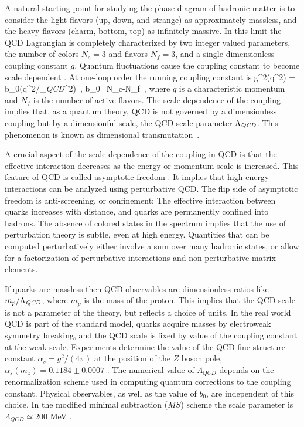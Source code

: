  A natural starting point for studying the phase diagram of hadronic 
matter is to consider the light flavors (up, down, and strange) as
approximately massless, and the heavy flavors (charm, bottom, top) as
infinitely massive. In this limit the QCD Lagrangian is completely
characterized by two integer valued parameters, the number of colors 
$N_c=3$ and flavors $N_f=3$, and a single dimensionless coupling 
constant $g$. Quantum fluctuations cause the coupling constant
to become scale dependent \cite{Gross:1973id,Politzer:1973fx}. At 
one-loop order the running coupling constant is
\be
\label{g_1l}
 g^2(q^2) = 
  {b_0\log(q^2/\Lambda_{\it QCD}^2)}\, , \hspace{1cm}
 b_0=N_c-N_f\, ,
\ee
where $q$ is a characteristic momentum and $N_f$ is the number of active 
flavors. The scale dependence of the coupling implies that, as a quantum 
theory, QCD is not governed by a dimensionless coupling but by a 
dimensionful scale, the QCD scale parameter $\Lambda_{\it QCD}$. This 
phenomenon is known as dimensional transmutation~\cite{Coleman:1973jx}. 

 A crucial aspect of the scale dependence of the coupling in QCD is that
the effective interaction decreases as the energy or momentum scale is 
increased. This feature of QCD is called asymptotic freedom
\cite{Gross:1973id,Politzer:1973fx}. It implies that high energy 
interactions can be analyzed using perturbative QCD. The flip side of 
asymptotic freedom is anti-screening, or confinement: The effective 
interaction between quarks increases with distance, and quarks are 
permanently confined into hadrons. The absence of colored states in 
the spectrum implies that the use of perturbation theory is subtle, 
even at high energy. Quantities that can be computed perturbatively 
either involve a sum over many hadronic states, or allow for a 
factorization of perturbative interactions and non-perturbative 
matrix elements. 

 If quarks are massless then QCD observables are dimensionless ratios
like $m_p/\Lambda_{\it QCD}$, where $m_p$ is the mass of the proton. This
implies that the QCD scale is not a parameter of the theory, but reflects
a choice of units. In the real world QCD is part of the standard model,
quarks acquire masses by electroweak symmetry breaking, and the QCD 
scale is fixed by value of the coupling constant at the weak scale. 
Experiments determine the value of the QCD fine structure constant
$\alpha_s=g^2/(4\pi)$ at the position of the $Z$ boson pole, $\alpha_s
(m_z)= 0.1184\pm 0.0007$ \cite{Nakamura:2010zzi}. The numerical value 
of $\Lambda_{QCD}$ depends on the renormalization scheme used in
computing quantum corrections to the coupling constant. Physical 
observables, as well as the value of $b_0$, are independent of this 
choice. In the modified minimal subtraction ($\overline{MS}$) scheme
the scale parameter is $\Lambda_{QCD}\simeq 200$ MeV \cite{Nakamura:2010zzi}.

